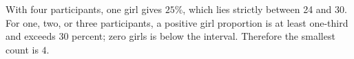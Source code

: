 With four participants, one girl gives $25\%$, which lies strictly between 24 and 30. For one, two, or three participants, a positive girl proportion is at least one-third and exceeds 30 percent; zero girls is below the interval. Therefore the smallest count is $\boxed4$.
